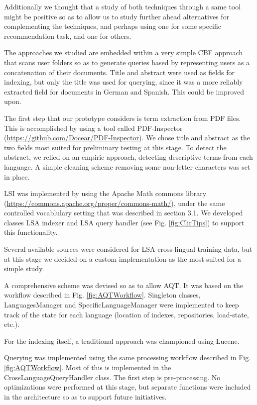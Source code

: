 \documentclass{llncs}
\begin{document}
Additionally we thought that a study of both techniques through a same tool might be positive so as to allow us to study further ahead alternatives for complementing the techniques, and perhaps using one for some specific recommendation task, and one for others.

The approaches we studied are embedded within a very simple CBF approach that scans user folders so as to generate queries based by representing users as a concatenation of their documents. Title and abstract were used as fields for indexing, but only the title was used for querying, since it was a more reliably extracted field for documents in German and Spanish. This could be improved upon.

The first step that our prototype considers is term extraction from PDF files. This is accomplished by using a tool called PDF-Inspector (\url{https://github.com/Docear/PDF-Inspector}). We chose title and abstract as the two fields most suited for preliminary testing at this stage. To detect the abstract, we relied on an empiric approach, detecting descriptive terms from each language. A simple cleaning scheme removing some non-letter characters was set in place.

LSI was implemented by using the Apache Math commons library (\url{https://commons.apache.org/proper/commons-math/}), under the same controlled vocablulary setting that was described in section 3.1. We developed classes LSA indexer and LSA query handler (see Fig. \ref{fig:ClirTips}) to support this functionality.

Several available sources were considered for LSA cross-lingual training data, but at this stage we decided on a custom implementation as the most suited for a simple study. 

A comprehensive scheme was devised so as to allow AQT. It was based on the workflow described in Fig. \ref{fig:AQTWorkflow}. Singleton classes, LanguagesManager and SpecificLanguageManager were implemented to keep track of the state for each language (location of indexes, repositories, load-state, etc.). 

For the indexing itself, a traditional approach was championed using Lucene. 

Querying was implemented using the same processing workflow described in Fig. \ref{fig:AQTWorkflow}. Most of this is implemented in the CrossLanguageQueryHandler class. The first step is pre-processing. No optimizations were performed at this stage, but separate functions were included in the architecture so as to support future initiatives.
\end{document}
